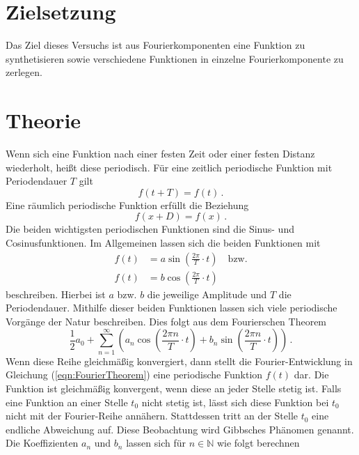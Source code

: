\nocite{anleitungV351}
\section{Zielsetzung}
\label{sec:Zielsetzung}
Das Ziel dieses Versuchs ist aus Fourierkomponenten eine Funktion zu synthetisieren sowie verschiedene Funktionen 
in einzelne Fourierkomponente zu zerlegen. 
\section{Theorie}
\label{sec:Theorie}
Wenn sich eine Funktion nach einer festen Zeit oder einer festen Distanz wiederholt, heißt diese periodisch. Für eine
zeitlich periodische Funktion mit Periodendauer $T$ gilt
\begin{equation}
    f(t+T) = f(t)\,.
    \label{eqn:zeitlichPeriodisch}
\end{equation}
Eine räumlich periodische Funktion erfüllt die Beziehung 
\begin{equation}
    f(x+D) = f(x)\,.
    \label{eqn:räumlichPeriodisch}
\end{equation}
Die beiden wichtigsten periodischen Funktionen sind die Sinus- und Cosinusfunktionen. Im Allgemeinen lassen sich die beiden
Funktionen mit 
\begin{align}
    f(t)& = a\sin\left(\frac{2\pi}{T}\cdot t\right)\quad\text{bzw.} \label{eqn:allgSinus}\\
    f(t)& = b\cos\left(\frac{2\pi}{T}\cdot t\right) \label{eqn:allgCosinus}
\end{align}
beschreiben. Hierbei ist $a$ bzw. $b$ die jeweilige Amplitude und $T$ die Periodendauer. Mithilfe dieser beiden Funktionen 
lassen sich viele periodische Vorgänge der Natur beschreiben. Dies folgt aus dem Fourierschen Theorem
\begin{equation}
    \frac{1}{2}a_0 + \sum_{n=1}^{\infty}\left(a_n\cos\left(\frac{2\pi n}{T}\cdot t\right)+b_n\sin\left(\frac{2\pi n}{T}\cdot t\right)\right)\,.
    \label{eqn:FourierTheorem}
\end{equation}
Wenn diese Reihe gleichmäßig konvergiert, dann stellt die Fourier-Entwicklung in Gleichung (\ref{eqn:FourierTheorem}) eine periodische 
Funktion $f(t)$ dar. Die Funktion ist gleichmäßig konvergent, wenn diese an jeder Stelle stetig ist. Falls eine Funktion an einer Stelle $t_0$
nicht stetig ist, lässt sich diese Funktion bei $t_0$ nicht mit der Fourier-Reihe annähern. Stattdessen tritt an der Stelle $t_0$ eine endliche Abweichung
auf. Diese Beobachtung wird Gibbsches Phänomen genannt. Die Koeffizienten $a_n$ und $b_n$ lassen sich für $n \in \mathbb{N}$ wie folgt berechnen
